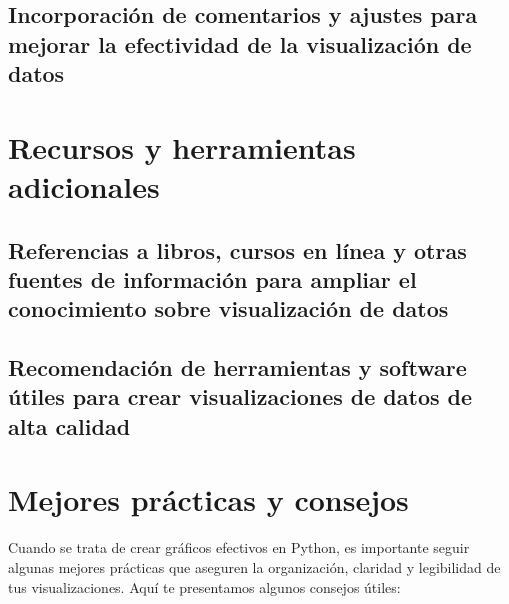 \documentclass[
  a4paper,
]{article}
\begin{document}
\hypertarget{incorporaciuxf3n-de-comentarios-y-ajustes-para-mejorar-la-efectividad-de-la-visualizaciuxf3n-de-datos}{%
\subsection{Incorporación de comentarios y ajustes para mejorar la
efectividad de la visualización de
datos}\label{incorporaciuxf3n-de-comentarios-y-ajustes-para-mejorar-la-efectividad-de-la-visualizaciuxf3n-de-datos}}

\hypertarget{recursos-y-herramientas-adicionales}{%
\section{Recursos y herramientas
adicionales}\label{recursos-y-herramientas-adicionales}}

\hypertarget{referencias-a-libros-cursos-en-luxednea-y-otras-fuentes-de-informaciuxf3n-para-ampliar-el-conocimiento-sobre-visualizaciuxf3n-de-datos}{%
\subsection{Referencias a libros, cursos en línea y otras fuentes de
información para ampliar el conocimiento sobre visualización de
datos}\label{referencias-a-libros-cursos-en-luxednea-y-otras-fuentes-de-informaciuxf3n-para-ampliar-el-conocimiento-sobre-visualizaciuxf3n-de-datos}}

\hypertarget{recomendaciuxf3n-de-herramientas-y-software-uxfatiles-para-crear-visualizaciones-de-datos-de-alta-calidad}{%
\subsection{Recomendación de herramientas y software útiles para crear
visualizaciones de datos de alta
calidad}\label{recomendaciuxf3n-de-herramientas-y-software-uxfatiles-para-crear-visualizaciones-de-datos-de-alta-calidad}}

\hypertarget{mejores-pruxe1cticas-y-consejos}{%
\section{Mejores prácticas y
consejos}\label{mejores-pruxe1cticas-y-consejos}}

Cuando se trata de crear gráficos efectivos en Python, es importante
seguir algunas mejores prácticas que aseguren la organización, claridad
y legibilidad de tus visualizaciones. Aquí te presentamos algunos
consejos útiles:
\end{document}
